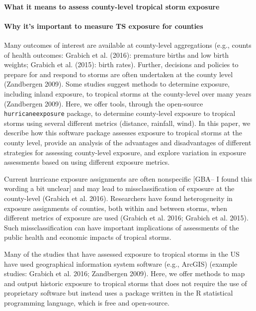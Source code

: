 \documentclass[]{elsarticle} %
\begin{document}
\paragraph{What it means to assess county-level tropical storm
exposure}\label{what-it-means-to-assess-county-level-tropical-storm-exposure}

\paragraph{Why it's important to measure TS exposure for
counties}\label{why-its-important-to-measure-ts-exposure-for-counties}

Many outcomes of interest are available at county-level aggregations
(e.g., counts of health outcomes: Grabich et al. (2016): premature
births and low birth weights; Grabich et al. (2015): birth rates).
Further, decisions and policies to prepare for and respond to storms are
often undertaken at the county level (Zandbergen 2009). Some studies
suggest methods to determine exposure, including inland exposure, to
tropical storms at the county-level over many years (Zandbergen 2009).
Here, we offer tools, through the open-source \texttt{hurricaneexposure}
package, to determine county-level exposure to tropical storms using
several different metrics (distance, rainfall, wind). In this paper, we
describe how this software package assesses exposure to tropical storms
at the county level, provide an analysis of the advantages and
disadvantages of different strategies for assessing county-level
exposure, and explore variation in exposure assessments based on using
different exposure metrics.

Current hurricane exposure assignments are often nonspecific {[}GBA-- I
found this wording a bit unclear{]} and may lead to missclassification
of exposure at the county-level (Grabich et al. 2016). Researchers have
found heterogeneity in exposure assignments of counties, both within and
between storms, when different metrics of exposure are used (Grabich et
al. 2016; Grabich et al. 2015). Such missclassification can have
important implications of assessments of the public health and economic
impacts of tropical storms.

Many of the studies that have assessed exposure to tropical storms in
the US have used geographical information system software (e.g., ArcGIS)
(example studies: Grabich et al. 2016; Zandbergen 2009). Here, we offer
methods to map and output historic exposure to tropical storms that does
not require the use of proprietary software but instead uses a package
written in the R statistical programming language, which is free and
open-source.
\end{document}
